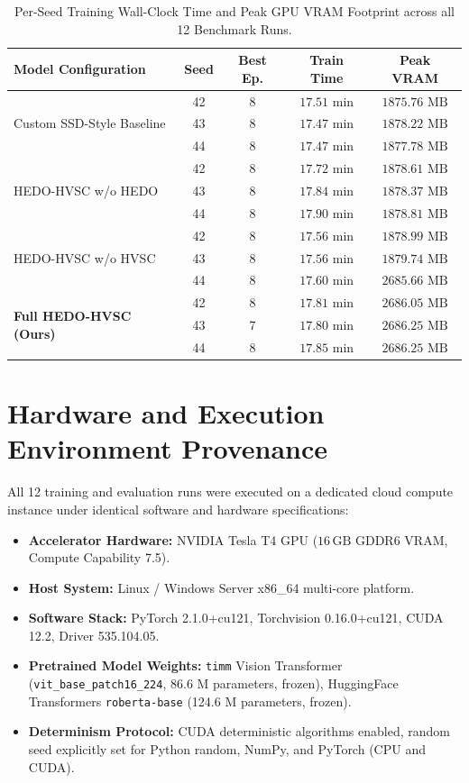 \documentclass[journal]{IEEEtran}
\begin{document}
\begin{table}[!t]
\centering
\caption{Per-Seed Training Wall-Clock Time and Peak GPU VRAM Footprint across all 12 Benchmark Runs.}
\label{tab:supp_compute_provenance}
\small
\begin{tabular}{lcccc}
\toprule
\textbf{Model Configuration} & \textbf{Seed} & \textbf{Best Ep.} & \textbf{Train Time} & \textbf{Peak VRAM} \\
\midrule
\multirow{3}{*}{Custom SSD-Style Baseline} & 42 & 8 & $17.51\text{ min}$ & $1875.76\text{ MB}$ \\
 & 43 & 8 & $17.47\text{ min}$ & $1878.22\text{ MB}$ \\
 & 44 & 8 & $17.47\text{ min}$ & $1877.78\text{ MB}$ \\
\midrule
\multirow{3}{*}{HEDO-HVSC w/o HEDO} & 42 & 8 & $17.72\text{ min}$ & $1878.61\text{ MB}$ \\
 & 43 & 8 & $17.84\text{ min}$ & $1878.37\text{ MB}$ \\
 & 44 & 8 & $17.90\text{ min}$ & $1878.81\text{ MB}$ \\
\midrule
\multirow{3}{*}{HEDO-HVSC w/o HVSC} & 42 & 8 & $17.56\text{ min}$ & $1878.99\text{ MB}$ \\
 & 43 & 8 & $17.56\text{ min}$ & $1879.74\text{ MB}$ \\
 & 44 & 8 & $17.60\text{ min}$ & $2685.66\text{ MB}$ \\
\midrule
\multirow{3}{*}{\textbf{Full HEDO-HVSC (Ours)}} & 42 & 8 & $17.81\text{ min}$ & $2686.05\text{ MB}$ \\
 & 43 & 7 & $17.80\text{ min}$ & $2686.25\text{ MB}$ \\
 & 44 & 8 & $17.85\text{ min}$ & $2686.25\text{ MB}$ \\
\bottomrule
\end{tabular}
\end{table}

\section{Hardware and Execution Environment Provenance}
\label{sec:supp_hardware_env}
All 12 training and evaluation runs were executed on a dedicated cloud compute instance under identical software and hardware specifications:
\begin{itemize}
    \item \textbf{Accelerator Hardware:} NVIDIA Tesla T4 GPU ($16\,\text{GB}$ GDDR6 VRAM, Compute Capability 7.5).
    \item \textbf{Host System:} Linux / Windows Server x86\_64 multi-core platform.
    \item \textbf{Software Stack:} PyTorch 2.1.0+cu121, Torchvision 0.16.0+cu121, CUDA 12.2, Driver 535.104.05.
    \item \textbf{Pretrained Model Weights:} \texttt{timm} Vision Transformer (\texttt{vit\_base\_patch16\_224}, 86.6 M parameters, frozen), HuggingFace Transformers \texttt{roberta-base} (124.6 M parameters, frozen).
    \item \textbf{Determinism Protocol:} CUDA deterministic algorithms enabled, random seed explicitly set for Python random, NumPy, and PyTorch (CPU and CUDA).
\end{itemize}
\end{document}
